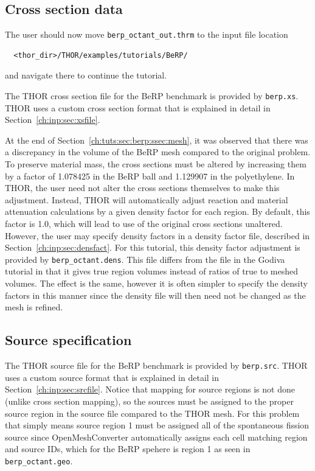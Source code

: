 \subsection{Cross section data}

The user should now move \verb"berp_octant_out.thrm" to the input file location
\begin{verbatim}
  <thor_dir>/THOR/examples/tutorials/BeRP/
\end{verbatim}
and navigate there to continue the tutorial.

The \ac{THOR} cross section file for the BeRP benchmark is provided by \verb"berp.xs".
\ac{THOR} uses a custom cross section format that is explained in detail in Section~\ref{ch:inp:sec:xsfile}.

At the end of Section~\ref{ch:tuts:sec:berp:ssec:mesh}, it was observed that there was a discrepancy in the volume of the BeRP mesh compared to the original problem.
To preserve material mass, the cross sections must be altered by increasing them by a factor of 1.078425 in the BeRP ball and 1.129907 in the polyethylene.
In \ac{THOR}, the user need not alter the cross sections themselves to make this adjustment.
Instead, \ac{THOR} will automatically adjust reaction and material attenuation calculations by a given density factor for each region.
By default, this factor is 1.0, which will lead to use of the original cross sections unaltered.
However, the user may specify density factors in a density factor file, described in Section~\ref{ch:inp:sec:densfact}.
For this tutorial, this density factor adjustment is provided by \verb"berp_octant.dens".
This file differs from the file in the Godiva tutorial in that it gives true region volumes instead of ratios of true to meshed volumes.
The effect is the same, however it is often simpler to specify the density factors in this manner since the density file will then need not be changed as the mesh is refined.

\subsection{Source specification}

The \ac{THOR} source file for the BeRP benchmark is provided by \verb"berp.src".
\ac{THOR} uses a custom source format that is explained in detail in Section~\ref{ch:inp:sec:srcfile}.
Notice that mapping for source regions is not done (unlike cross section mapping), so the sources must be assigned to the proper source region in the source file compared to the THOR mesh.
For this problem that simply means source region 1 must be assigned all of the spontaneous fission source since OpenMeshConverter automatically assigns each cell matching region and source IDs, which for the BeRP spehere is region 1 as seen in \verb"berp_octant.geo".

